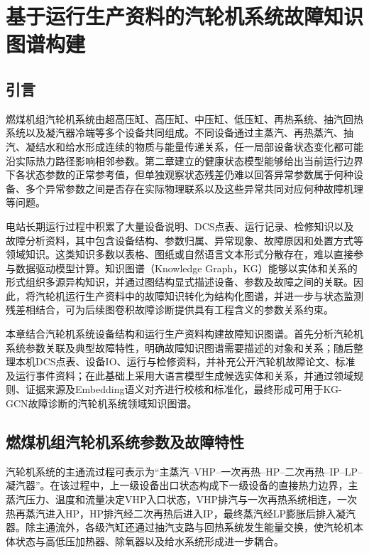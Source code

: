 \section{基于运行生产资料的汽轮机系统故障知识图谱构建}
\label{sec:knowledge_graph_v4}

\subsection{引言}

燃煤机组汽轮机系统由超高压缸、高压缸、中压缸、低压缸、再热系统、抽汽回热系统以及凝汽器冷端等多个设备共同组成。不同设备通过主蒸汽、再热蒸汽、抽汽、凝结水和给水形成连续的物质与能量传递关系，任一局部设备状态变化都可能沿实际热力路径影响相邻参数。第二章建立的健康状态模型能够给出当前运行边界下各状态参数的正常参考值，但单独观察状态残差仍难以回答异常参数属于何种设备、多个异常参数之间是否存在实际物理联系以及这些异常共同对应何种故障机理等问题。

电站长期运行过程中积累了大量设备说明、DCS点表、运行记录、检修知识以及故障分析资料，其中包含设备结构、参数归属、异常现象、故障原因和处置方式等领域知识。这类知识多数以表格、图纸或自然语言文本形式分散存在，难以直接参与数据驱动模型计算。知识图谱（Knowledge Graph，KG）能够以实体和关系的形式组织多源异构知识，并通过图结构显式描述设备、参数及故障之间的关联\cite{Hogan2021KnowledgeGraphs}。因此，将汽轮机运行生产资料中的故障知识转化为结构化图谱，并进一步与状态监测残差相结合，可为后续图卷积故障诊断提供具有工程含义的参数关系约束。

本章结合汽轮机系统设备结构和运行生产资料构建故障知识图谱。首先分析汽轮机系统参数关联及典型故障特性，明确故障知识图谱需要描述的对象和关系；随后整理本机DCS点表、设备IO、运行与检修资料，并补充公开汽轮机故障论文、标准及运行事件资料；在此基础上采用大语言模型生成候选实体和关系，并通过领域规则、证据来源及Embedding语义对齐进行校核和标准化，最终形成可用于KG-GCN故障诊断的汽轮机系统领域知识图谱。

\subsection{燃煤机组汽轮机系统参数及故障特性}
\label{subsec:turbine_fault_characteristics_v4}

汽轮机系统的主通流过程可表示为“主蒸汽--VHP--一次再热--HP--二次再热--IP--LP--凝汽器”。在该过程中，上一级设备出口状态构成下一级设备的直接热力边界，主蒸汽压力、温度和流量决定VHP入口状态，VHP排汽与一次再热系统相连，一次热再蒸汽进入HP，HP排汽经二次再热后进入IP，最终蒸汽经LP膨胀后排入凝汽器。除主通流外，各级汽缸还通过抽汽支路与回热系统发生能量交换，使汽轮机本体状态与高低压加热器、除氧器以及给水系统形成进一步耦合。

